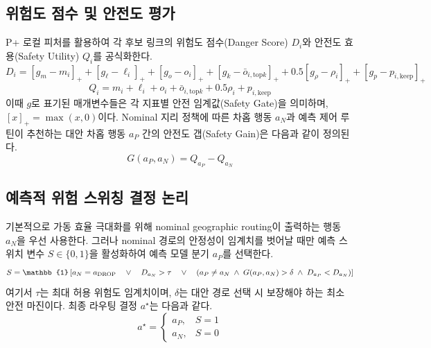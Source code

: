 \subsection{위험도 점수 및 안전도 평가}
P+ 로컬 피처를 활용하여 각 후보 링크의 위험도 점수(Danger Score) $D_i$와 안전도 효용(Safety Utility) $Q_i$를 공식화한다.
\begin{equation}
    D_i = [g_m - m_i]_+ + [g_\ell - \ell_i]_+ + [g_o - o_i]_+ + [g_k - \bar{o}_{i,\mathrm{top}k}]_+ + 0.5[g_\rho - \rho_i]_+ + [g_p - p_{i,\mathrm{keep}}]_+
\end{equation}
\begin{equation}
    Q_i = m_i + \ell_i + o_i + \bar{o}_{i,\mathrm{top}k} + 0.5\rho_i + p_{i,\mathrm{keep}}
\end{equation}
이때 $g$로 표기된 매개변수들은 각 지표별 안전 임계값(Safety Gate)을 의미하며, $[x]_+ = \max(x, 0)$이다. Nominal 지리 정책에 따른 차홉 행동 $a_N$과 예측 제어 루틴이 추천하는 대안 차홉 행동 $a_P$ 간의 안전도 갭(Safety Gain)은 다음과 같이 정의된다.
\begin{equation}
    G(a_P, a_N) = Q_{a_P} - Q_{a_N}
\end{equation}

\subsection{예측적 위험 스위칭 결정 논리}
기본적으로 가동 효율 극대화를 위해 nominal geographic routing이 출력하는 행동 $a_N$을 우선 사용한다. 그러나 nominal 경로의 안정성이 임계치를 벗어날 때만 예측 스위치 변수 $S \in \{0, 1\}$을 활성화하여 예측 모델 분기 $a_P$를 선택한다.
\begin{equation}
    S = \mathbb{1}\left[ a_N = \dropact \quad \lor \quad D_{a_N} > \tau \quad \lor \quad \left( a_P \neq a_N \; \land \; G(a_P, a_N) > \delta \; \land \; D_{a_P} < D_{a_N} \right) \right]
\end{equation}
여기서 $\tau$는 최대 허용 위험도 임계치이며, $\delta$는 대안 경로 선택 시 보장해야 하는 최소 안전 마진이다. 최종 라우팅 결정 $a^\star$는 다음과 같다.
\begin{equation}
    a^\star = \begin{cases} a_P, & S = 1 \\ a_N, & S = 0 \end{cases}
\end{equation}

